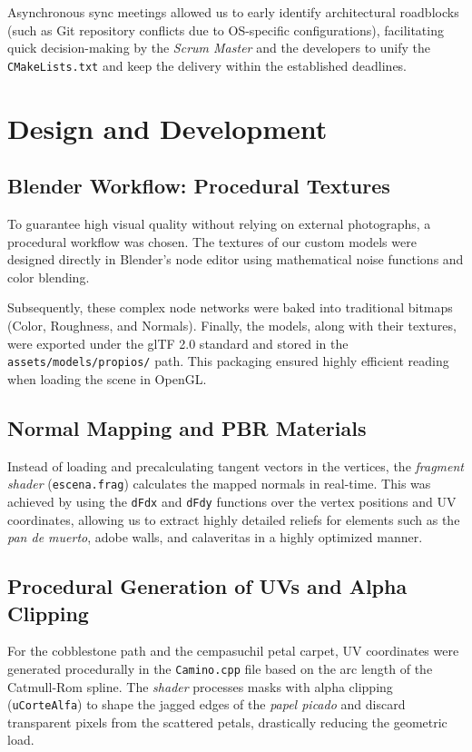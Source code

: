 \documentclass[letter,11pt]{article}
\begin{document}
	Asynchronous sync meetings allowed us to early identify architectural roadblocks (such as Git repository conflicts due to OS-specific configurations), facilitating quick decision-making by the \textit{Scrum Master} and the developers to unify the \texttt{CMakeLists.txt} and keep the delivery within the established deadlines.
	
	\section{Design and Development}
	
	\subsection{Blender Workflow: Procedural Textures}
	To guarantee high visual quality without relying on external photographs, a procedural workflow was chosen. The textures of our custom models were designed directly in Blender's node editor using mathematical noise functions and color blending.
	
	Subsequently, these complex node networks were baked into traditional bitmaps (Color, Roughness, and Normals). Finally, the models, along with their textures, were exported under the glTF 2.0 standard and stored in the \texttt{assets/models/propios/} path. This packaging ensured highly efficient reading when loading the scene in OpenGL.
	
	\subsection{Normal Mapping and PBR Materials}
	Instead of loading and precalculating tangent vectors in the vertices, the \textit{fragment shader} (\texttt{escena.frag}) calculates the mapped normals in real-time. This was achieved by using the \texttt{dFdx} and \texttt{dFdy} functions over the vertex positions and UV coordinates, allowing us to extract highly detailed reliefs for elements such as the \textit{pan de muerto}, adobe walls, and calaveritas in a highly optimized manner.
	
	\subsection{Procedural Generation of UVs and Alpha Clipping}
	For the cobblestone path and the cempasuchil petal carpet, UV coordinates were generated procedurally in the \texttt{Camino.cpp} file based on the arc length of the Catmull-Rom spline. The \textit{shader} processes masks with alpha clipping (\texttt{uCorteAlfa}) to shape the jagged edges of the \textit{papel picado} and discard transparent pixels from the scattered petals, drastically reducing the geometric load.
	
\end{document}
